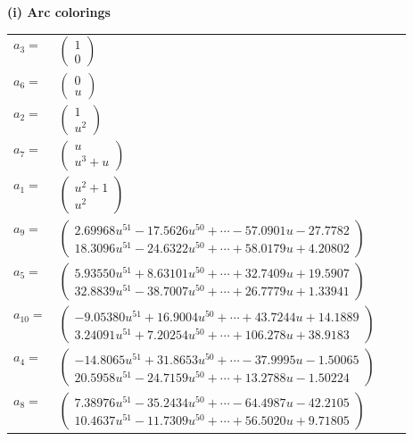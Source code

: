 \documentclass[1p]{elsarticle_modified}
\theoremstyle{definition}
\begin{document}
\flushleft \textbf{(i) Arc colorings}\\
\begin{tabular}{m{7pt} m{180pt} m{7pt} m{180pt} }
\flushright $a_{3}=$&$\begin{pmatrix}1\\0\end{pmatrix}$ \\
\flushright $a_{6}=$&$\begin{pmatrix}0\\u\end{pmatrix}$ \\
\flushright $a_{2}=$&$\begin{pmatrix}1\\u^2\end{pmatrix}$ \\
\flushright $a_{7}=$&$\begin{pmatrix}u\\u^3+u\end{pmatrix}$ \\
\flushright $a_{1}=$&$\begin{pmatrix}u^2+1\\u^2\end{pmatrix}$ \\
\flushright $a_{9}=$&$\begin{pmatrix}2.69968 u^{51}-17.5626 u^{50}+\cdots-57.0901 u-27.7782\\18.3096 u^{51}-24.6322 u^{50}+\cdots+58.0179 u+4.20802\end{pmatrix}$ \\
\flushright $a_{5}=$&$\begin{pmatrix}5.93550 u^{51}+8.63101 u^{50}+\cdots+32.7409 u+19.5907\\32.8839 u^{51}-38.7007 u^{50}+\cdots+26.7779 u+1.33941\end{pmatrix}$ \\
\flushright $a_{10}=$&$\begin{pmatrix}-9.05380 u^{51}+16.9004 u^{50}+\cdots+43.7244 u+14.1889\\3.24091 u^{51}+7.20254 u^{50}+\cdots+106.278 u+38.9183\end{pmatrix}$ \\
\flushright $a_{4}=$&$\begin{pmatrix}-14.8065 u^{51}+31.8653 u^{50}+\cdots-37.9995 u-1.50065\\20.5958 u^{51}-24.7159 u^{50}+\cdots+13.2788 u-1.50224\end{pmatrix}$ \\
\flushright $a_{8}=$&$\begin{pmatrix}7.38976 u^{51}-35.2434 u^{50}+\cdots-64.4987 u-42.2105\\10.4637 u^{51}-11.7309 u^{50}+\cdots+56.5020 u+9.71805\end{pmatrix}$ \\

\end{tabular}
\end{document}
